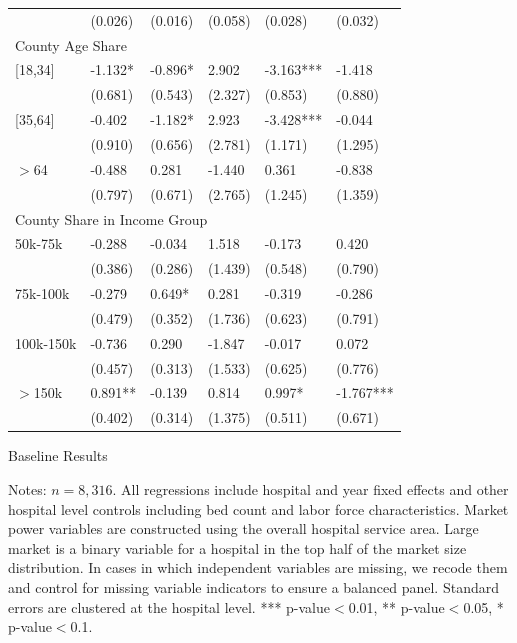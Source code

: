 \documentclass[12pt]{article}
\begin{document}
{\begin{tabular}{llllll}
							&	(0.026)	&	(0.016)	&	(0.058)	&	(0.028)	&	(0.032)	\\
\multicolumn{6}{l}{County Age Share}\\											
\hspace{0.1in}[18,34]			&	-1.132*	&	-0.896*	&	2.902	&	-3.163***	&	-1.418	\\
							&	(0.681)	&	(0.543)	&	(2.327)	&	(0.853)	&	(0.880)	\\
\hspace{0.1in}[35,64]			&	-0.402	&	-1.182*	&	2.923	&	-3.428***	&	-0.044	\\
							&	(0.910)&	(0.656)	&	(2.781)	&	(1.171)	&	(1.295)	\\
\hspace{0.1in} $>$64			&	-0.488	&	0.281	&	-1.440	&	0.361	&	-0.838	\\
							&	(0.797)	&	(0.671)	&	(2.765)	&	(1.245)	&	(1.359)	\\
\multicolumn{6}{l}{County Share in Income Group}\\											
\hspace{0.1in} 50k-75k			&	-0.288	&	-0.034	&	1.518	&	-0.173	&	0.420	\\
							&	(0.386)	&	(0.286)	&	(1.439)	&	(0.548)	&	(0.790)	\\
\hspace{0.1in} 75k-100k			&	-0.279	&	0.649*	&	0.281	&	-0.319	&	-0.286	\\
							&	(0.479)	&	(0.352)	&	(1.736)	&	(0.623)	&	(0.791)	\\
\hspace{0.1in} 100k-150k			&	-0.736	&	0.290	&	-1.847	&	-0.017	&	0.072	\\
							&	(0.457)	&	(0.313)	&	(1.533)	&	(0.625)	&	(0.776)	\\
\hspace{0.1in}$>$150k			&	0.891**	&	-0.139	&	0.814	&	0.997*	&	-1.767***	\\
							&	(0.402)	&	(0.314)	&	(1.375)	&	(0.511)	&	(0.671)	\\
\hline
\end{tabular}
}
\setlength{\captionmargin}{.5 \textwidth} \addtolength{\captionmargin}{-.5\wd\gfxbox}
\begin{table}[htbp!]
\centering
\caption{Baseline Results}
\label{tab:baselineresults}
\usebox{\gfxbox}
\par
\begin{minipage}{\wd\gfxbox}
\footnotesize
Notes: $n=8,316$.  All regressions include hospital and year fixed effects and other hospital level controls including bed count and labor force characteristics.  Market power variables are constructed using the overall hospital service area.  Large market is a binary variable for a hospital in the top half of the market size distribution.  In cases in which independent variables are missing, we recode them and control for missing variable indicators to ensure a balanced panel.  Standard errors are clustered at the hospital level.  *** p-value$<$0.01, ** p-value$<$0.05, * p-value$<$0.1.
\end{minipage}
\end{table}
\end{document}

